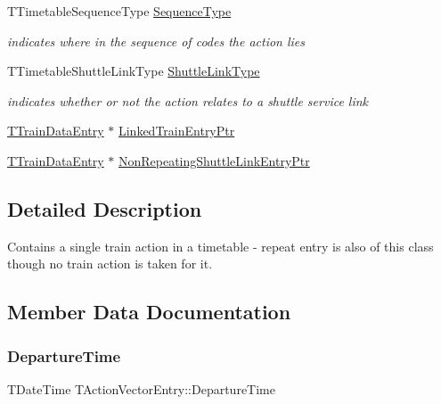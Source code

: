 \begin{DoxyCompactItemize}
\mbox{\label{class_t_action_vector_entry_a67b29560b218e8b8ba854d326a630682}} 
T\+Timetable\+Sequence\+Type \mbox{\hyperlink{class_t_action_vector_entry_a67b29560b218e8b8ba854d326a630682}{Sequence\+Type}}
\begin{DoxyCompactList}\small\item\em indicates where in the sequence of codes the action lies \end{DoxyCompactList}\item 
\mbox{\label{class_t_action_vector_entry_ae8efcbff8298cf829c26b0db65ffa6b3}} 
T\+Timetable\+Shuttle\+Link\+Type \mbox{\hyperlink{class_t_action_vector_entry_ae8efcbff8298cf829c26b0db65ffa6b3}{Shuttle\+Link\+Type}}
\begin{DoxyCompactList}\small\item\em indicates whether or not the action relates to a shuttle service link \end{DoxyCompactList}\item 
\mbox{\hyperlink{class_t_train_data_entry}{T\+Train\+Data\+Entry}} $\ast$ \mbox{\hyperlink{class_t_action_vector_entry_ab240a52305bd614f1921e86617687abf}{Linked\+Train\+Entry\+Ptr}}
\item 
\mbox{\hyperlink{class_t_train_data_entry}{T\+Train\+Data\+Entry}} $\ast$ \mbox{\hyperlink{class_t_action_vector_entry_a921897cd667dd8933de593e97e74a3a7}{Non\+Repeating\+Shuttle\+Link\+Entry\+Ptr}}
\end{DoxyCompactItemize}


\subsection{Detailed Description}
Contains a single train action in a timetable -\/ repeat entry is also of this class though no train action is taken for it. 

\subsection{Member Data Documentation}
\mbox{\label{class_t_action_vector_entry_a37c6ff0cda2672bbd60099487442fbb5}} 
\subsubsection{\texorpdfstring{Departure\+Time}{DepartureTime}}
{\footnotesize\ttfamily T\+Date\+Time T\+Action\+Vector\+Entry\+::\+Departure\+Time}

